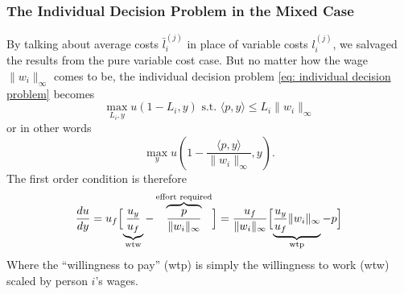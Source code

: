 \subsubsection{The Individual Decision Problem in the Mixed Case}

By talking about average costs \(\bar{l}_i^{(j)}\) in place of variable costs
\(l_i^{(j)}\), we salvaged the results from the pure variable
cost case. But no matter how the wage \(\|w_i\|_\infty\) comes to be, the
individual decision problem \eqref{eq: individual decision problem} becomes
\[
	\max_{L_i, y} u(1-L_i, y) \text{ s.t. } \langle p, y\rangle \le L_i \|w_i\|_\infty
\]
or in other words
\[
	\max_{y} u\left(1- \frac{\langle p, y\rangle}{\|w_i\|_\infty}, y\right).
\]
The first order condition is therefore
\[
	\frac{du}{dy} 
	= u_f\Bigl[
		\underbrace{\frac{u_y}{u_f}}_{\text{wtw}}
		- \overbrace{\frac{p}{\|w_i\|_\infty}}^{\text{effort required}}
	\Bigr]
	= \frac{u_f}{\|w_i\|_\infty}\Bigl[
		\underbrace{\frac{u_y}{u_f}\|w_i\|_\infty}_{\operatorname{wtp}}
		- p
	\Bigr]
\]
Where the ``willingness to pay'' (wtp) is simply the willingness to work
(wtw) scaled by person \(i\)'s wages.

